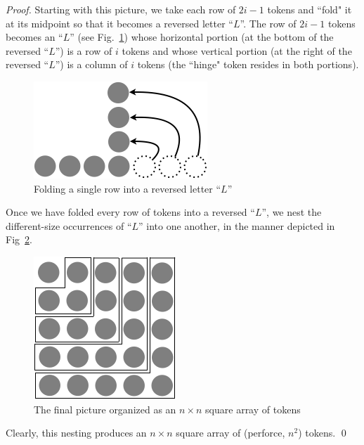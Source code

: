 \begin{proof}
Starting with this picture, we take each row of $2i-1$ tokens and ``fold" it at its midpoint so that it becomes a reversed letter ``$L$''.  The row of $2i-1$ tokens becomes an ``$L$'' (see Fig.~\ref{fig:sumOdds2}) whose horizontal portion (at the bottom of the reversed ``$L$'') is a row of $i$ tokens and whose vertical portion (at the right of the reversed ``$L$'') is a column of $i$ tokens (the ``hinge" token resides in both portions).
\begin{figure}[ht]
\begin{center}
       \includegraphics[scale=0.4]{FiguresMaths/SumOddsIntermediate}
              \caption{Folding a single row into a reversed letter ``$L$''}
       \label{fig:sumOdds2}
\end{center}
\end{figure}

Once we have folded every row of tokens into a reversed ``$L$'', we nest the different-size occurrences of ``$L$'' into one another, in the manner depicted in Fig~\ref{fig:sumOdds3}.
\begin{figure}[ht]
\begin{center}
       \includegraphics[scale=0.4]{FiguresMaths/SumOddsFinal}
\caption{The final picture organized as an $n \times n$ square array of tokens}
       \label{fig:sumOdds3}
\end{center}
\end{figure}
Clearly, this nesting produces an $n \times n$ square array of (perforce, $n^2$) tokens.  \qed
\end{proof}

\medskip


